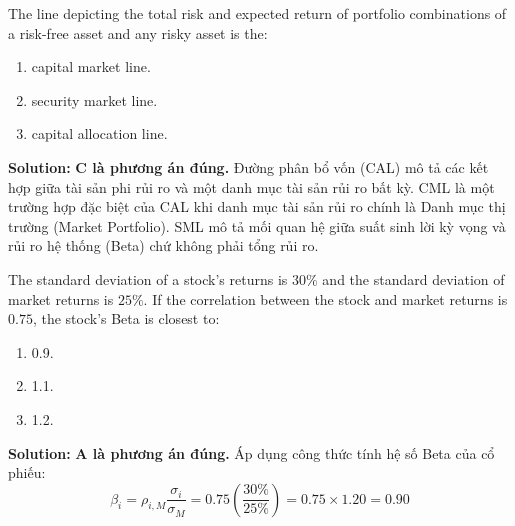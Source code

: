\begin{tcolorbox}[
	colback=gray!5!white,
	colframe=black!15!white,
	boxrule=0.5pt,
	arc=3pt,
	title=\textbf{Question 1},
	coltitle=black,
	colbacktitle=black!5!white,
	before skip=6pt,
	after skip=6pt,
	breakable
]
The line depicting the total risk and expected return of portfolio combinations of a risk-free asset and any risky asset is the:
\begin{enumerate}[label=\Alph*.]
	\item capital market line.
	\item security market line.
	\item capital allocation line.
\end{enumerate}

\textbf{Solution:}
\textbf{C là phương án đúng.} Đường phân bổ vốn (CAL) mô tả các kết hợp giữa tài sản phi rủi ro và một danh mục tài sản rủi ro bất kỳ. CML là một trường hợp đặc biệt của CAL khi danh mục tài sản rủi ro chính là Danh mục thị trường (Market Portfolio). SML mô tả mối quan hệ giữa suất sinh lời kỳ vọng và rủi ro hệ thống (Beta) chứ không phải tổng rủi ro.
\end{tcolorbox}

\begin{tcolorbox}[
	colback=gray!5!white,
	colframe=black!15!white,
	boxrule=0.5pt,
	arc=3pt,
	title=\textbf{Question 2},
	coltitle=black,
	colbacktitle=black!5!white,
	before skip=6pt,
	after skip=6pt,
	breakable
]
The standard deviation of a stock's returns is $30\%$ and the standard deviation of market returns is $25\%$. If the correlation between the stock and market returns is $0.75$, the stock's Beta is closest to:
\begin{enumerate}[label=\Alph*.]
	\item 0.9.
	\item 1.1.
	\item 1.2.
\end{enumerate}

\textbf{Solution:}
\textbf{A là phương án đúng.} Áp dụng công thức tính hệ số Beta của cổ phiếu:
\[
\beta_i = \rho_{i,M} \frac{\sigma_i}{\sigma_M} = 0.75 \left(\frac{30\%}{25\%}\right) = 0.75 \times 1.20 = 0.90
\]
\end{tcolorbox}

